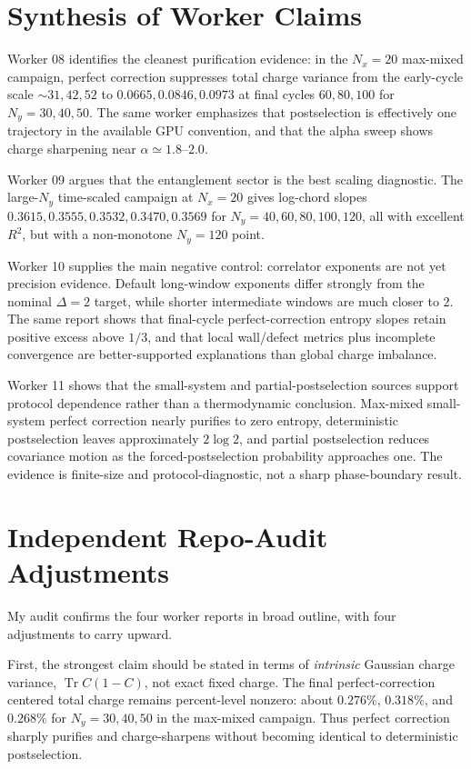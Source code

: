 \documentclass[aps,prb,onecolumn,nofootinbib,superscriptaddress]{revtex4-2}
\newcommand{\Nx}{N_x}
\newcommand{\Ny}{N_y}
\begin{document}
\section{Synthesis of Worker Claims}

Worker 08 identifies the cleanest purification evidence: in the $\Nx=20$ max-mixed campaign, perfect correction suppresses total charge variance from the early-cycle scale $\sim 31,42,52$ to $0.0665,0.0846,0.0973$ at final cycles $60,80,100$ for $\Ny=30,40,50$.  The same worker emphasizes that postselection is effectively one trajectory in the available GPU convention, and that the alpha sweep shows charge sharpening near $\alpha\simeq1.8$--$2.0$.

Worker 09 argues that the entanglement sector is the best scaling diagnostic.  The large-$\Ny$ time-scaled campaign at $\Nx=20$ gives log-chord slopes $0.3615,0.3555,0.3532,0.3470,0.3569$ for $\Ny=40,60,80,100,120$, all with excellent $R^2$, but with a non-monotone $\Ny=120$ point.

Worker 10 supplies the main negative control: correlator exponents are not yet precision evidence.  Default long-window exponents differ strongly from the nominal $\Delta=2$ target, while shorter intermediate windows are much closer to $2$.  The same report shows that final-cycle perfect-correction entropy slopes retain positive excess above $1/3$, and that local wall/defect metrics plus incomplete convergence are better-supported explanations than global charge imbalance.

Worker 11 shows that the small-system and partial-postselection sources support protocol dependence rather than a thermodynamic conclusion.  Max-mixed small-system perfect correction nearly purifies to zero entropy, deterministic postselection leaves approximately $2\log 2$, and partial postselection reduces covariance motion as the forced-postselection probability approaches one.  The evidence is finite-size and protocol-diagnostic, not a sharp phase-boundary result.

\section{Independent Repo-Audit Adjustments}

My audit confirms the four worker reports in broad outline, with four adjustments to carry upward.

First, the strongest claim should be stated in terms of \emph{intrinsic} Gaussian charge variance, $\operatorname{Tr} C(1-C)$, not exact fixed charge.  The final perfect-correction centered total charge remains percent-level nonzero: about $0.276\%$, $0.318\%$, and $0.268\%$ for $\Ny=30,40,50$ in the max-mixed campaign.  Thus perfect correction sharply purifies and charge-sharpens without becoming identical to deterministic postselection.
\end{document}
